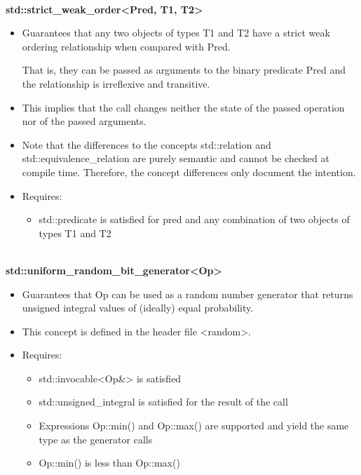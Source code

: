 \noindent
\hspace*{\fill} \\ %
\textbf{std::strict\_weak\_order<Pred, T1, T2>}

\begin{itemize}
\item
Guarantees that any two objects of types T1 and T2 have a strict weak ordering relationship when compared with Pred.

That is, they can be passed as arguments to the binary predicate Pred and the relationship is irreflexive and transitive.

\item
This implies that the call changes neither the state of the passed operation nor of the passed arguments.

\item
Note that the differences to the concepts std::relation and std::equivalence\_relation are purely semantic and cannot be checked at compile time. Therefore, the concept differences only document the intention.

\item
Requires:
\begin{itemize}
\item
std::predicate is satisfied for pred and any combination of two objects of types T1 and T2
\end{itemize}
\end{itemize}

\noindent
\hspace*{\fill} \\ %
\textbf{std::uniform\_random\_bit\_generator<Op>}

\begin{itemize}
\item
Guarantees that Op can be used as a random number generator that returns unsigned integral values of (ideally) equal probability.

\item
This concept is defined in the header file <random>.

\item
Requires:
\begin{itemize}
\item
std::invocable<Op\&> is satisfied

\item
std::unsigned\_integral is satisfied for the result of the call

\item
Expressions Op::min() and Op::max() are supported and yield the same type as the generator calls

\item
 Op::min() is less than Op::max()
\end{itemize}
\end{itemize}

